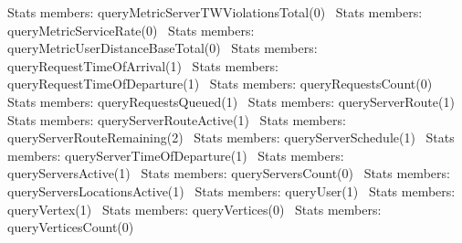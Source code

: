 \LA{}Stats members: queryMetricServerTWViolationsTotal(0)~{\nwtagstyle{}}\RA{}
\LA{}Stats members: queryMetricServiceRate(0)~{\nwtagstyle{}}\RA{}
\LA{}Stats members: queryMetricUserDistanceBaseTotal(0)~{\nwtagstyle{}}\RA{}
\LA{}Stats members: queryRequestTimeOfArrival(1)~{\nwtagstyle{}}\RA{}
\LA{}Stats members: queryRequestTimeOfDeparture(1)~{\nwtagstyle{}}\RA{}
\LA{}Stats members: queryRequestsCount(0)~{\nwtagstyle{}}\RA{}
\LA{}Stats members: queryRequestsQueued(1)~{\nwtagstyle{}}\RA{}
\LA{}Stats members: queryServerRoute(1)~{\nwtagstyle{}}\RA{}
\LA{}Stats members: queryServerRouteActive(1)~{\nwtagstyle{}}\RA{}
\LA{}Stats members: queryServerRouteRemaining(2)~{\nwtagstyle{}}\RA{}
\LA{}Stats members: queryServerSchedule(1)~{\nwtagstyle{}}\RA{}
\LA{}Stats members: queryServerTimeOfDeparture(1)~{\nwtagstyle{}}\RA{}
\LA{}Stats members: queryServersActive(1)~{\nwtagstyle{}}\RA{}
\LA{}Stats members: queryServersCount(0)~{\nwtagstyle{}}\RA{}
\LA{}Stats members: queryServersLocationsActive(1)~{\nwtagstyle{}}\RA{}
\LA{}Stats members: queryUser(1)~{\nwtagstyle{}}\RA{}
\LA{}Stats members: queryVertex(1)~{\nwtagstyle{}}\RA{}
\LA{}Stats members: queryVertices(0)~{\nwtagstyle{}}\RA{}
\LA{}Stats members: queryVerticesCount(0)~{\nwtagstyle{}}\RA{}
\nwendcode{}\nwdocspar

